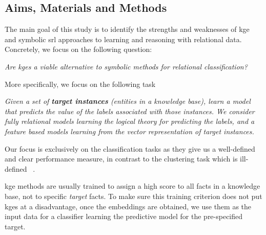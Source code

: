 \subsection{Aims, Materials and Methods}

The main goal of this study is to identify the strengths and weaknesses of  \gls{kge} and symbolic \gls{srl} approaches to learning and reasoning with relational data.
Concretely, we focus on the following question:

\begin{displayquote}
\textit{Are \gls{kge}s a viable alternative to symbolic methods for relational classification?}
\end{displayquote}


\noindent More specifically, we focus on the following task

\begin{displayquote}
\textit{Given a set of \textbf{target instances} (entities in a knowledge base), learn a model that predicts the value of the labels associated with those instances. We consider fully relational models learning the logical theory for predicting the labels, and a feature based models learning from the vector representation of target instances.}
\end{displayquote}


Our focus is exclusively on the classification tasks as they give us a well-defined and clear performance measure, in contrast to the clustering task which is ill-defined ~\cite{Estivill-Castro:2002}.






\gls{kge} methods are usually trained to assign a high score to all facts in a knowledge base, not to specific \textit{target} facts.
To make sure this training criterion does not put \gls{kge}s at a disadvantage, once the embeddings are obtained, we use them as the input data for a classifier learning the predictive model for the pre-specified target.



